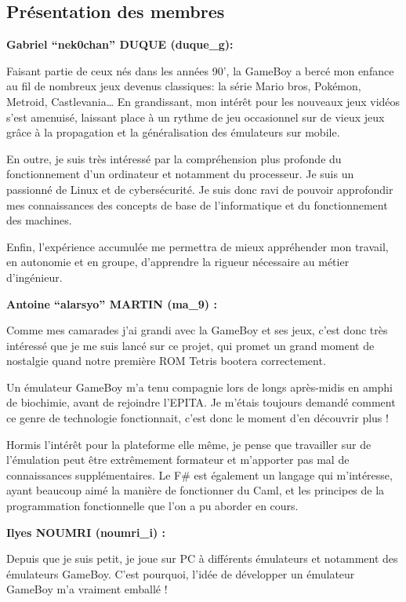 \documentclass[12pt, a4paper]{article}
\begin{document}
\pagebreak

\subsection{Présentation des membres}
\bigskip
\textbf{Gabriel “nek0chan” DUQUE (duque\_g):} 
\medskip

Faisant partie de ceux nés dans les années 90’, la GameBoy a bercé mon enfance au fil de nombreux jeux devenus classiques: la série Mario bros, Pokémon, Metroid, Castlevania… En grandissant, mon intérêt pour les nouveaux jeux vidéos s’est amenuisé, laissant place à un rythme de jeu occasionnel sur de vieux jeux grâce à la propagation et la généralisation des émulateurs sur mobile.
\medskip

En outre, je suis très intéressé par la compréhension plus profonde du fonctionnement d’un ordinateur et notamment du  processeur. Je suis un passionné de Linux et de cybersécurité. Je suis donc ravi de pouvoir approfondir mes connaissances des concepts de base de l’informatique et du fonctionnement des machines.
\medskip

Enfin, l’expérience accumulée me permettra de mieux appréhender mon travail, en autonomie et en groupe, d’apprendre la rigueur nécessaire au métier d’ingénieur.
\bigskip
\bigskip

\textbf{Antoine “alarsyo” MARTIN (ma\_9) :} 
\medskip  

Comme mes camarades j’ai grandi avec la GameBoy et ses jeux, c’est donc très intéressé que je me suis lancé sur ce projet, qui promet un grand moment de nostalgie quand notre première ROM Tetris bootera correctement. 
\medskip

Un émulateur GameBoy m’a tenu compagnie lors de longs après-midis en amphi de biochimie, avant de rejoindre l’EPITA. Je m'étais toujours demandé comment ce genre de technologie fonctionnait, c’est donc le moment d’en découvrir plus !
\medskip

Hormis l'intérêt pour la plateforme elle même, je pense que travailler sur de l’émulation peut être extrêmement formateur et m’apporter pas mal de connaissances supplémentaires. Le F\# est également un langage qui m'intéresse, ayant beaucoup aimé la manière de fonctionner du Caml, et les principes de la programmation fonctionnelle que l’on a pu aborder en cours.
\bigskip

\pagebreak

\textbf{Ilyes  NOUMRI (noumri\_i) :}
\medskip

Depuis que je suis petit, je joue sur PC à différents émulateurs et notamment des émulateurs GameBoy. C’est pourquoi, l’idée de développer un émulateur GameBoy m’a vraiment emballé !
\medskip
\end{document}
